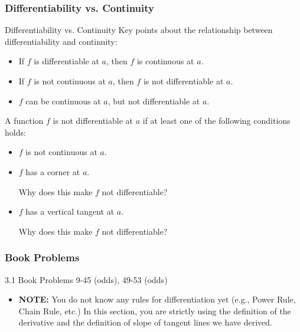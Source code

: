 \documentclass[cal1spr16Lectures.tex]{subfiles}
\begin{document}
\subsubsection{Differentiability vs. Continuity}

\begin{frame}{\small Differentiability vs. Continuity}
Key points about the relationship between differentiability and continuity:
\begin{itemize}
\item If $f$ is differentiable at $a$, then $f$ is continuous at $a$.
\item If $f$ is not continuous at $a$, then $f$ is not differentiable at $a$.
\item $f$ can be continuous at $a$, but not differentiable at $a$.
\end{itemize}
\end{frame}

\begin{frame}{}
A function $f$ is \alert{not} differentiable at $a$ if at least one of the following conditions holds:
\begin{itemize}
\item[1.] $f$ is not continuous at $a$.
\item[2.] $f$ has a corner at $a$.  
\begin{que} Why does this make $f$ not differentiable? \end{que}
\item[3.] $f$ has a vertical tangent at $a$.  
\begin{que} Why does this make $f$ not differentiable? \end{que}
\end{itemize}
\end{frame}

\subsubsection{Book Problems}

\begin{frame}
\begin{block}{3.1 Book Problems} 9-45 (odds), 49-53 (odds) \end{block}
\begin{itemize}
\item {\bf NOTE:}  You do not know any rules for differentiation yet (e.g., Power Rule, Chain Rule, etc.)  In this section, you are strictly using the definition of the derivative and the definition of slope of tangent lines we have derived.
\end{itemize}
\end{frame}
\end{document}
